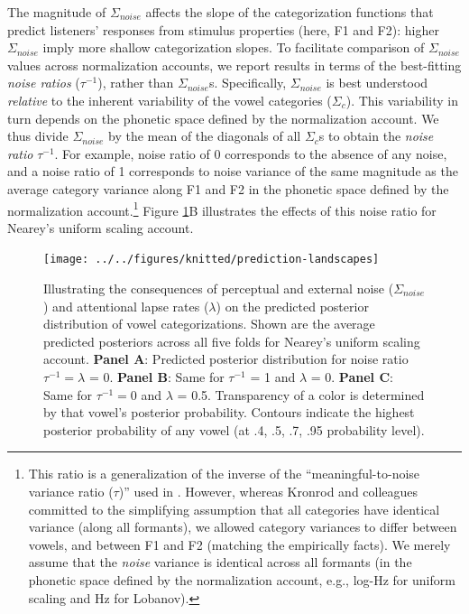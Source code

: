 \documentclass[preprint]{JASA}
\begin{document}
The magnitude of \(\Sigma_{noise}\) affects the slope of the categorization functions that predict listeners' responses from stimulus properties (here, F1 and F2): higher \(\Sigma_{noise}\) imply more shallow categorization slopes. To facilitate comparison of \(\Sigma_{noise}\) values across normalization accounts, we report results in terms of the best-fitting \emph{noise ratios} (\(\tau^{-1}\)), rather than \(\Sigma_{noise}\)s. Specifically, \(\Sigma_{noise}\) is best understood \emph{relative} to the inherent variability of the vowel categories (\(\Sigma_c\)). This variability in turn depends on the phonetic space defined by the normalization account. We thus divide \(\Sigma_{noise}\) by the mean of the diagonals of all \(\Sigma_c\)s to obtain the \emph{noise ratio} \(\tau^{-1}\). For example, noise ratio of 0 corresponds to the absence of any noise, and a noise ratio of 1 corresponds to noise variance of the same magnitude as the average category variance along F1 and F2 in the phonetic space defined by the normalization account.\footnote{This ratio is a generalization of the inverse of the ``meaningful-to-noise variance ratio (\(\tau\))'' used in \citet{kronrod2016}. However, whereas Kronrod and colleagues committed to the simplifying assumption that all categories have identical variance (along all formants), we allowed category variances to differ between vowels, and between F1 and F2 (matching the empirically facts). We merely assume that the \emph{noise} variance is identical across all formants (in the phonetic space defined by the normalization account, e.g., log-Hz for uniform scaling and Hz for Lobanov).} Figure \ref{fig:prediction-landscapes}B illustrates the effects of this noise ratio for Nearey's uniform scaling account.



\begin{figure}[!ht]

{\centering \texttt{[image: ../../figures/knitted/prediction-landscapes]} 

}

\caption{Illustrating the consequences of perceptual and external noise (\(\Sigma_{noise}\)) and attentional lapse rates (\(\lambda\)) on the predicted posterior distribution of vowel categorizations. Shown are the average predicted posteriors across all five folds for Nearey's uniform scaling account. \textbf{Panel A}: Predicted posterior distribution for noise ratio \(\tau^{-1} = \lambda\) = 0. \textbf{Panel B}: Same for \(\tau^{-1}\) = 1 and \(\lambda\) = 0. \textbf{Panel C}: Same for \(\tau^{-1} = 0\) and \(\lambda\) = 0.5. Transparency of a color is determined by that vowel's posterior probability. Contours indicate the highest posterior probability of any vowel (at .4, .5, .7, .95 probability level).}\label{fig:prediction-landscapes}
\end{figure}
\end{document}
